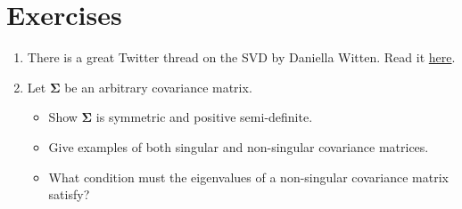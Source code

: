 \documentclass[]{book}
\newenvironment{Shaded}{\begin{snugshade}}{\end{snugshade}}
\newcommand{\ControlFlowTok}[1]{\textcolor[rgb]{0.13,0.29,0.53}{\textbf{#1}}}
\newcommand{\DecValTok}[1]{\textcolor[rgb]{0.00,0.00,0.81}{#1}}
\newcommand{\KeywordTok}[1]{\textcolor[rgb]{0.13,0.29,0.53}{\textbf{#1}}}
\newcommand{\NormalTok}[1]{#1}
\newcommand{\OperatorTok}[1]{\textcolor[rgb]{0.81,0.36,0.00}{\textbf{#1}}}
\newcommand{\StringTok}[1]{\textcolor[rgb]{0.31,0.60,0.02}{#1}}
\providecommand{\tightlist}{%
  \setlength{\itemsep}{0pt}\setlength{\parskip}{0pt}}
\theoremstyle{definition}
\theoremstyle{definition}
\theoremstyle{definition}
\theoremstyle{remark}
\begin{document}
\begin{Shaded}
\end{Shaded}

\hypertarget{exercises-ch3}{%
\section{Exercises}\label{exercises-ch3}}

\begin{enumerate}
\def\labelenumi{\arabic{enumi}.}
\setcounter{enumi}{-1}
\item
  There is a great Twitter thread on the SVD by Daniella Witten. Read it \href{https://twitter.com/WomenInStat/status/1285610321747611653}{here}.
\item
  Let \(\boldsymbol{\Sigma}\) be an arbitrary covariance matrix.

  \begin{itemize}
  \tightlist
  \item
    Show \(\boldsymbol{\Sigma}\) is symmetric and
    positive semi-definite.
  \item
    Give examples of both singular and non-singular covariance matrices.\\
  \item
    What condition must the eigenvalues of a non-singular covariance matrix satisfy?
  \end{itemize}
\end{enumerate}
\end{document}
